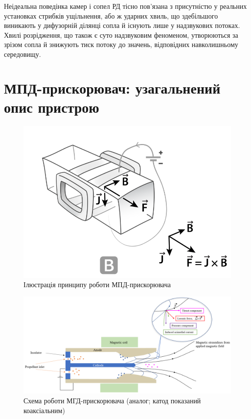 Неідеальна поведінка камер і сопел РД тісно пов'язана з присутністю у реальних установках стрибків ущільнення, або ж ударних хвиль, що здебільшого виникають у дифузорній ділянці сопла й існують лише у надзвукових потоках. Хвилі розрідження, що також є суто надзвуковим феноменом, утворюються за зрізом сопла й знижують тиск потоку до значень, відповідних навколишньому середовищу.~\cite[с. 52 -- 69]{Sutton}

\section{МПД-прискорювач: узагальнений опис пристрою}

\begin{figure}
	\centering
	\includegraphics[width=0.6\textheight, angle=0,origin=c]{chapter_1/MHD_thruster_principle.png}
	\caption{Ілюстрація принципу роботи МПД-прискорювача}
	\label{fig:MHD_thruster_principle}
\end{figure}

\begin{figure}
	\centering
	\includegraphics[width=0.6\textheight, angle=0,origin=c]{chapter_1/MHD_thruster_coaxial.jpg}
	\caption{Схема роботи МГД-прискорювача (аналог; катод показаний коаксіальним)}
	\label{fig:MHD_thruster_coaxial}
\end{figure}

